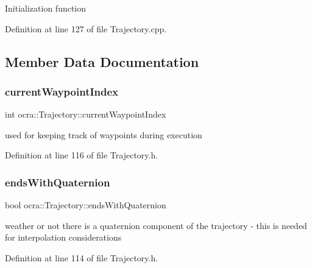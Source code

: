 Initialization function

Definition at line 127 of file Trajectory.\+cpp.



\subsection{Member Data Documentation}
\hypertarget{classocra_1_1Trajectory_a2eb6b279dca80ba684969374ddea0d8c}{}\label{classocra_1_1Trajectory_a2eb6b279dca80ba684969374ddea0d8c} 
\subsubsection{\texorpdfstring{current\+Waypoint\+Index}{currentWaypointIndex}}
{\footnotesize\ttfamily int ocra\+::\+Trajectory\+::current\+Waypoint\+Index\hspace{0.3cm}{\ttfamily [protected]}}

used for keeping track of waypoints during execution 

Definition at line 116 of file Trajectory.\+h.

\hypertarget{classocra_1_1Trajectory_a4f230978860de9473f83df3b8ae31ad9}{}\label{classocra_1_1Trajectory_a4f230978860de9473f83df3b8ae31ad9} 
\subsubsection{\texorpdfstring{ends\+With\+Quaternion}{endsWithQuaternion}}
{\footnotesize\ttfamily bool ocra\+::\+Trajectory\+::ends\+With\+Quaternion\hspace{0.3cm}{\ttfamily [protected]}}

weather or not there is a quaternion component of the trajectory -\/ this is needed for interpolation considerations 

Definition at line 114 of file Trajectory.\+h.

\hypertarget{classocra_1_1Trajectory_a9dbb0a7d6ecaeaf98b915193a8c853d7}{}\label{classocra_1_1Trajectory_a9dbb0a7d6ecaeaf98b915193a8c853d7} 
